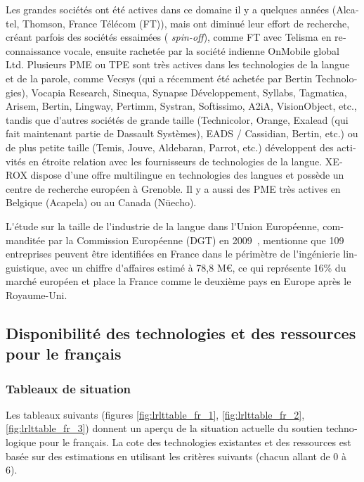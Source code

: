 \begin{french}
\begin{multicols}{2}
Les grandes sociétés ont été actives dans ce domaine il y a quelques
années (Alcatel, Thomson, France Télécom (FT)), mais ont diminué leur
effort de recherche, créant parfois des sociétés essaimées ({\em
  spin-off}), comme FT avec Telisma en reconnaissance vocale, ensuite
rachetée par la société indienne OnMobile global Ltd. Plusieurs PME ou
TPE sont très actives dans les technologies de la langue et de la
parole, comme Vecsys (qui a récemment été achetée par Bertin
Technologies), Vocapia Research, Sinequa, Synapse Développement,
Syllabs, Tagmatica, Arisem, Bertin, Lingway, Pertimm, Systran,
Softissimo, A2iA, VisionObject, etc., tandis que d{\mbox '}autres
sociétés de grande taille (Technicolor, Orange, Exalead (qui fait
maintenant partie de Dassault Systèmes), EADS / Cassidian, Bertin,
etc.) ou de plus petite taille (Temis, Jouve, Aldebaran, Parrot, etc.)
développent des activités en étroite relation avec les fournisseurs de
technologies de la langue. XEROX dispose d'une offre multilingue en
technologies des langues et possède un centre de recherche européen à
Grenoble. Il y a aussi des PME très actives en Belgique (Acapela) ou
au Canada (Nüecho).

L{\mbox '}étude sur la taille de l{\mbox '}industrie de la langue dans l{\mbox '}Union
Européenne, commanditée par la Commission Européenne (DGT) en
2009~\cite{DGT09}, mentionne que 109 entreprises peuvent être
identifiées en France dans le périmètre de l{\mbox '}ingénierie linguistique,
avec un chiffre d{\mbox '}affaires estimé à 78,8 M€, ce qui représente 16\% du
marché européen et place la France comme le deuxième pays en
Europe après le Royaume-Uni.

\subsection{Disponibilité des technologies et des ressources pour le français}



\subsubsection{Tableaux de situation}
Les tableaux suivants (figures \ref{fig:lrlttable_fr_1},
\ref{fig:lrlttable_fr_2}, \ref{fig:lrlttable_fr_3}) donnent un aperçu
de la situation actuelle du soutien technologique pour le français. La
cote des technologies existantes et des ressources est basée sur des
estimations en utilisant les critères suivants (chacun allant de 0 à
6).


\end{multicols}
\end{french}
